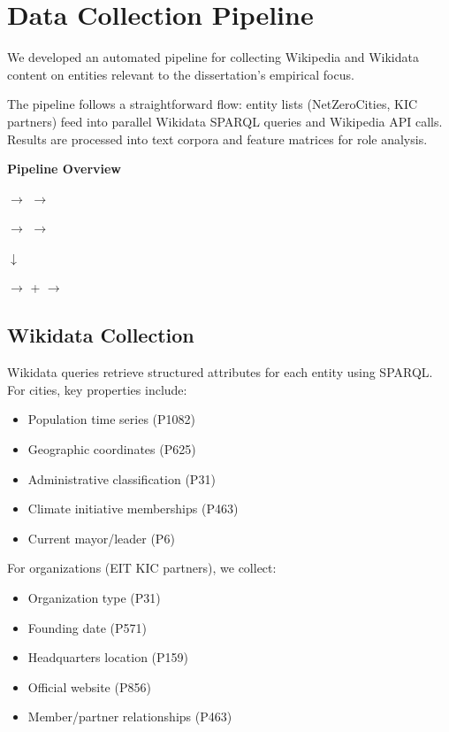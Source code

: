 \section{Data Collection Pipeline}

We developed an automated pipeline for collecting Wikipedia and Wikidata content on entities relevant to the dissertation's empirical focus.

The pipeline follows a straightforward flow: entity lists (NetZeroCities, KIC partners) feed into parallel Wikidata SPARQL queries and Wikipedia API calls. Results are processed into text corpora and feature matrices for role analysis.

\begin{center}
\textbf{Pipeline Overview}

\smallskip
{} $\rightarrow$  $\rightarrow$ 

 $\rightarrow$  $\rightarrow$ 

$\downarrow$

 $\rightarrow$  +  $\rightarrow$ 
\end{center}

\subsection{Wikidata Collection}

Wikidata queries retrieve structured attributes for each entity using SPARQL. For cities, key properties include:

\begin{itemize}
    \item Population time series (P1082)
    \item Geographic coordinates (P625)
    \item Administrative classification (P31)
    \item Climate initiative memberships (P463)
    \item Current mayor/leader (P6)
\end{itemize}

For organizations (EIT KIC partners), we collect:

\begin{itemize}
    \item Organization type (P31)
    \item Founding date (P571)
    \item Headquarters location (P159)
    \item Official website (P856)
    \item Member/partner relationships (P463)
\end{itemize}

